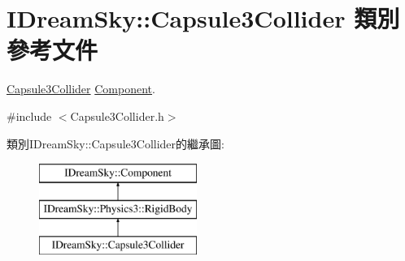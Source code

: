 \hypertarget{class_i_dream_sky_1_1_capsule3_collider}{}\section{I\+Dream\+Sky\+:\+:Capsule3\+Collider 類別 參考文件}
\label{class_i_dream_sky_1_1_capsule3_collider}


\hyperlink{class_i_dream_sky_1_1_capsule3_collider}{Capsule3\+Collider} \hyperlink{class_i_dream_sky_1_1_component}{Component}.  




{\ttfamily \#include $<$Capsule3\+Collider.\+h$>$}

類別\+I\+Dream\+Sky\+:\+:Capsule3\+Collider的繼承圖\+:\begin{figure}[H]
\begin{center}
\leavevmode
\includegraphics[height=3.000000cm]{class_i_dream_sky_1_1_capsule3_collider}
\end{center}
\end{figure}
